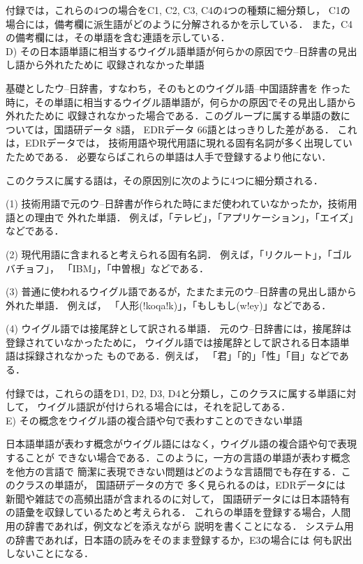 {付録\cite{JUDIC_APPENDIX}では，これらの4つの場合をC1, C2, C3, C4の4つの種類に細分類し，
C1の場合には，備考欄に派生語がどのように分解されるかを示している．
また，C4の備考欄には，その単語を含む連語を示している．\\

D) その日本語単語に相当するウイグル語単語が何らかの原因でウ--日辞書の見出し語から外れたために
収録されなかった単語

基礎としたウ--日辞書\cite{UJDIC}，すなわち，そのもとのウイグル語--中国語辞書\cite{UHDIC}を
作った時に，その単語に相当するウイグル語単語が，何らかの原因でその見出し語から外れたために
収録されなかった場合である．このグループに属する単語の数については，国語研データ 8語，
EDRデータ 66語とはっきりした差がある．
これは，EDRデータでは，
技術用語や現代用語に現れる固有名詞が多く出現していたためである．
必要ならばこれらの単語は人手で登録するより他にない．

このクラスに属する語は，その原因別に次のように4つに細分類される．

(1) 技術用語で元のウ--日辞書が作られた時にまだ使われていなかったか，技術用語との理由で
外れた単語． 例えば，「テレビ」，「アプリケーション」，「エイズ」などである．

(2) 現代用語に含まれると考えられる固有名詞． 例えば，「リクルート」，「ゴルバチョフ」，
「IBM」，「中曽根」などである．

(3) 普通に使われるウイグル語であるが，たまたま元のウ--日辞書の見出し語から外れた単語． 例えば，
「人形(!koqa!k)」，「もしもし(w!ey)」などである．

(4) ウイグル語では接尾辞として訳される単語． 元のウ--日辞書には，接尾辞は
登録されていなかったために，
ウイグル語では接尾辞として訳される日本語単語は採録されなかった
ものである．例えば，
「君」「的」「性」「目」などである．

付録\cite{JUDIC_APPENDIX}では，これらの語をD1, D2, D3, D4と分類し，このクラスに属する単語に対して，
ウイグル語訳が付けられる場合には，それを記してある．\\

E) その概念をウイグル語の複合語や句で表わすことのできない単語

日本語単語が表わす概念がウイグル語にはなく，ウイグル語の複合語や句で表現することが
できない場合である．このように，一方の言語の単語が表わす概念を他方の言語で
簡潔に表現できない問題はどのような言語間でも存在する．このクラスの単語が，
国語研データの方で
多く見られるのは，EDRデータには
新聞や雑誌での高頻出語が含まれるのに対して，
国語研データには日本語特有の語彙を収録しているためと考えられる．
これらの単語を登録する場合，人間用の辞書であれば，例文などを添えながら
説明を書くことになる．
システム用の辞書であれば，日本語の読みをそのまま登録するか，E3の場合には
何も訳出しないことになる．

}
